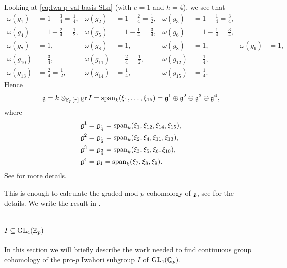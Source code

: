 Looking at \eqref{eq:Iwa-p-val-basis-SLn} (with $e=1$ and $h=4$), we see that
\begin{align*}
  \omega(g_{1}) &= 1-\frac{3}{4} = \frac{1}{4}, & \omega(g_{2}) &= 1-\frac{2}{4} = \frac{1}{2}, & \omega(g_{3}) &= 1-\frac{1}{4} = \frac{3}{4}, \\
  \omega(g_{4}) &= 1-\frac{2}{4} = \frac{1}{2}, & \omega(g_{5}) &= 1-\frac{1}{4} = \frac{3}{4}, & \omega(g_{6}) &= 1-\frac{1}{4} = \frac{3}{4}, \\
  \omega(g_{7}) &= 1, & \omega(g_{8}) &= 1, & \omega(g_{8}) &= 1, & \omega(g_{9}) &= 1, \\
  \omega(g_{10}) &= \frac{3}{4}, &  \omega(g_{11}) &= \frac{2}{4} = \frac{1}{2}, & \omega(g_{12}) &= \frac{1}{4}, \\
  \omega(g_{13}) &= \frac{2}{4} = \frac{1}{2}, & \omega(g_{14}) &= \frac{1}{4}, & \omega(g_{15}) &= \frac{1}{4}.
\end{align*}
Hence
\begin{equation*}
  \mathfrak{g} = k \otimes_{\mathbb{F}_{p}[\pi]} \operatorname{gr} I = \operatorname{span}_{k}(\xi_{1},\dotsc,\xi_{15}) = \mathfrak{g}^{1} \oplus \mathfrak{g}^{2} \oplus \mathfrak{g}^{3} \oplus \mathfrak{g}^{4},
\end{equation*}
where
\begin{align*}
  \mathfrak{g}^{1} &= \mathfrak{g}_{\frac{1}{4}} = \operatorname{span}_{k}(\xi_{1},\xi_{12},\xi_{14},\xi_{15}), \\
  \mathfrak{g}^{2} &= \mathfrak{g}_{\frac{1}{2}} = \operatorname{span}_{k}(\xi_{2},\xi_{4},\xi_{11},\xi_{13}), \\
  \mathfrak{g}^{3} &= \mathfrak{g}_{\frac{3}{4}} = \operatorname{span}_{k}(\xi_{3},\xi_{5},\xi_{6},\xi_{10}), \\
  \mathfrak{g}^{4} &= \mathfrak{g}_{1} = \operatorname{span}_{k}(\xi_{7},\xi_{8},\xi_{9}).
\end{align*}
See  for more details.

This is enough to calculate the graded mod $p$ cohomology of $\mathfrak{g}$, see \cite{code} for the details. We write the result in .

\section{\texorpdfstring{$I \subseteq \operatorname{GL}_{4}(\mathbb{Z}_{p})$}{I in GL4(Zp)}}%
\label{sec:GL4-calc}

In this section we will briefly describe the work needed to find continuous group cohomology of the pro-$p$ Iwahori subgroup $I$ of $\operatorname{GL}_{4}(\mathbb{Q}_{p})$.

